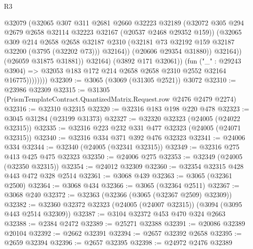 \begin{lexlean}{R3}
\begin{coremodule}
                              @32079
                              (@32065
                                @307
                                @311
                                @2681
                                @2660
                                @32223
                                @32189
                                (@32072
                                  @305
                                  @294
                                  @2679
                                  @2658
                                  @32114
                                  @32223
                                  @32167
                                  (@20537 @2468 @29352 @159))
                                (@32065
                                  @309
                                  @214
                                  @2658
                                  @2658
                                  @32187
                                  @2310
                                  (@32181 @73 @32192 @159 @32187 @32200 (@3795 (@32202 @73)))
                                  @32164))
                              (@20606 @29354 @31880))
                            @32164))
                        (@26059 @31875 @31881))
                      @32164)
                    (@3892 @171 @32061))
                  (fun ("_" : @29243 @3904) =>
                  @32053 @183 @172 @214 @2658 @2658 @2310 @2552 @32164 @16775))))))))
@32309 := @3065 (@3069 (@31305 @2521)) @3072
@32310 := @23986 @32309
@32315 := @31305 (PrismTemplateContract.QuantizedMatrix.Request.row @2476 @2479 @2274)
@32316 := @32310 @32315
@32320 := @32316 @183 @198 @220 @478
@32323 := @3045 @31284 (@23199 @31373)
@32327 := @32320 @32323 (@24005 (@24022 @32315))
@32335 := @32316 @223 @232 @331 @477 @32323 (@24005 (@24071 @32315))
@32340 := @32316 @334 @371 @392 @476 @32323
@32341 := @24006 @334
@32344 := @32340 (@24005 (@32341 @32315))
@32349 := @32316 @275 @413 @425 @475 @32323
@32350 := @24006 @275
@32353 := @32349 (@24005 (@32350 @32315))
@32354 := @24012 @32309
@32360 := @32354 @32315 @428 @443 @472 @328 @2514
@32361 := @3068 @439
@32363 := @3065 (@32361 @2500)
@32364 := @3068 @434
@32366 := @3065 (@32364 @2511)
@32367 := @3068 @240
@32372 := @32363 (@32366 (@3065 (@32367 @2509) @32309))
@32382 := @32360 @32372 @32323 (@24005 (@24007 @32315)) (@3094 (@3095 @443 @2514 @32309))
@32387 := @3104 @32372 @453 @470 @324 @2663
@32388 := @2384 @2472
@32389 := @25271 @32388
@32391 := @20086 @32389 @20104
@32392 := @2662 @32391
@32394 := @2657 @32392 @2658
@32395 := @2659 @32394
@32396 := @2657 @32395
@32398 := @24972 @2476 @32389

\end{coremodule}
\end{lexlean}

